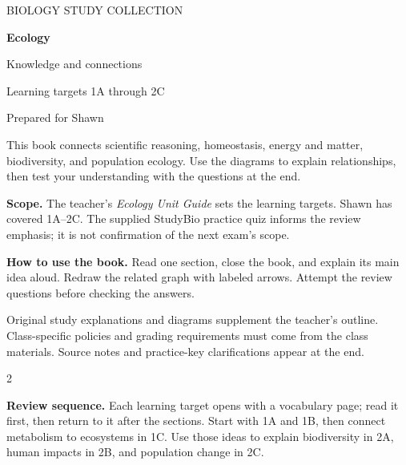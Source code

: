 \documentclass[11pt,letterpaper]{article}
\newcommand{\ico}[3][forest]{{\fontsize{#3}{#3}\selectfont\textcolor{#1}{#2}}}
\newcommand{\pn}[3]{\ico[#1]{#2}{19pt}\\[2pt]#3}
\begin{document}
\hypersetup{pageanchor=false}
\begin{titlepage}
\vspace*{0.7in}
{\sffamily\large BIOLOGY STUDY COLLECTION\par}
\vspace{0.35in}
{\Huge\bfseries Ecology\par}
\vspace{0.15in}
{\LARGE Knowledge and connections\par}
\vspace{0.25in}
{\Large Learning targets 1A through 2C\par}
\vspace{0.3in}
{\large Prepared for Shawn\par}
\vspace{0.5in}
\par
\vspace{0.45in}
This book connects scientific reasoning, homeostasis, energy and matter, biodiversity, and population ecology. Use the diagrams to explain relationships, then test your understanding with the questions at the end.

\textbf{Scope.} The teacher's \textit{Ecology Unit Guide} sets the learning targets. Shawn has covered 1A--2C. The supplied StudyBio practice quiz informs the review emphasis; it is not confirmation of the next exam's scope.

\textbf{How to use the book.} Read one section, close the book, and explain its main idea aloud. Redraw the related graph with labeled arrows. Attempt the review questions before checking the answers.
\vfill
{\small Original study explanations and diagrams supplement the teacher's outline. Class-specific policies and grading requirements must come from the class materials. Source notes and practice-key clarifications appear at the end.\par}
\end{titlepage}
\hypersetup{pageanchor=true}
{\setlength{\parskip}{0pt}\setlength{\columnsep}{18pt}\small\begin{multicols}{2}\tableofcontents\end{multicols}}
\vspace{12pt}
\textbf{Review sequence.} Each learning target opens with a vocabulary page; read it first, then return to it after the sections. Start with 1A and 1B, then connect metabolism to ecosystems in 1C. Use those ideas to explain biodiversity in 2A, human impacts in 2B, and population change in 2C.
\end{document}
